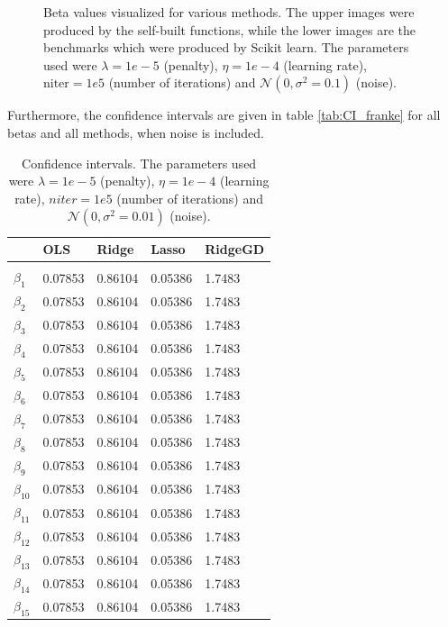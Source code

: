 \begin{figure} [H]
	\caption{Beta values visualized for various methods. The upper images were produced by the self-built functions, while the lower images are the benchmarks which were produced by Scikit learn. The parameters used were $\lambda=1e-5$ (penalty), $\eta=1e-4$ (learning rate), $\text{niter}=1e5$ (number of iterations) and $\mathcal{N}(0, \sigma^2=0.1)$ (noise).}%
	\label{fig:beta_plots}%
\end{figure}

\iffalse
Furthermore, the confidence intervals are given in table \eqref{tab:CI_franke} for all betas and all methods, when noise is included.

\begin{table} [H]
	\caption{Confidence intervals. The parameters used were $\lambda=1e-5$ (penalty), $\eta=1e-4$ (learning rate), $niter=1e5$ (number of iterations) and $\mathcal{N}(0, \sigma^2=0.01)$ (noise).  \vspace{2mm}}
	\begin{tabularx}{\textwidth}{l|XXXX} \hline\hline
		\label{tab:CI_franke}
		&\textbf{OLS}&\textbf{Ridge}&\textbf{Lasso}&\textbf{RidgeGD}\\ \hline \\
		$\beta_1$ & 0.07853 & 0.86104 & 0.05386 & 1.7483\\
		$\beta_2$ & 0.07853 & 0.86104 & 0.05386 & 1.7483\\
		$\beta_3$ & 0.07853 & 0.86104 & 0.05386 & 1.7483\\
		$\beta_4$ & 0.07853 & 0.86104 & 0.05386 & 1.7483\\
		$\beta_5$ & 0.07853 & 0.86104 & 0.05386 & 1.7483\\
		$\beta_6$ & 0.07853 & 0.86104 & 0.05386 & 1.7483\\
		$\beta_7$ & 0.07853 & 0.86104 & 0.05386 & 1.7483\\
		$\beta_8$ & 0.07853 & 0.86104 & 0.05386 & 1.7483\\
		$\beta_9$ & 0.07853 & 0.86104 & 0.05386 & 1.7483\\
		$\beta_{10}$ & 0.07853 & 0.86104 & 0.05386 & 1.7483\\
		$\beta_{11}$ & 0.07853 & 0.86104 & 0.05386 & 1.7483\\
		$\beta_{12}$ & 0.07853 & 0.86104 & 0.05386 & 1.7483\\
		$\beta_{13}$ & 0.07853 & 0.86104 & 0.05386 & 1.7483\\
		$\beta_{14}$ & 0.07853 & 0.86104 & 0.05386 & 1.7483\\
		$\beta_{15}$ & 0.07853 & 0.86104 & 0.05386 & 1.7483\\

\end{tabularx}
\end{table}
